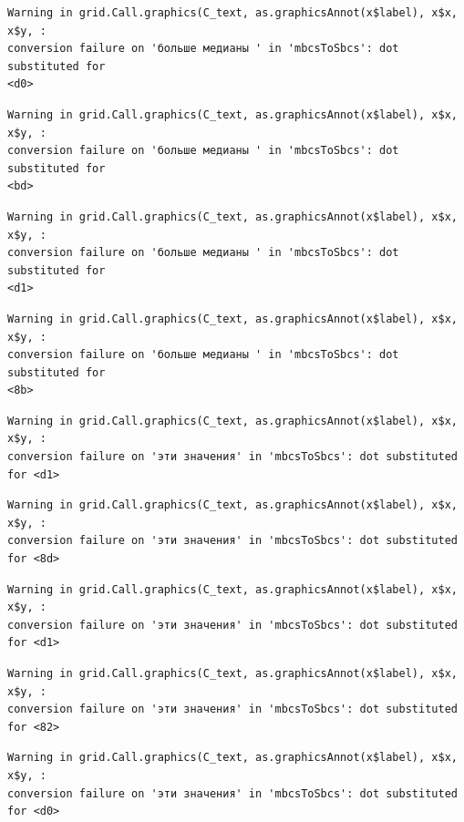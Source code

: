 \documentclass[
  letterpaper,
  DIV=11,
  numbers=noendperiod]{scrreprt}
\theoremstyle{definition}
\theoremstyle{remark}
\begin{document}
\begin{verbatim}
Warning in grid.Call.graphics(C_text, as.graphicsAnnot(x$label), x$x, x$y, :
conversion failure on 'больше медианы ' in 'mbcsToSbcs': dot substituted for
<d0>
\end{verbatim}

\begin{verbatim}
Warning in grid.Call.graphics(C_text, as.graphicsAnnot(x$label), x$x, x$y, :
conversion failure on 'больше медианы ' in 'mbcsToSbcs': dot substituted for
<bd>
\end{verbatim}

\begin{verbatim}
Warning in grid.Call.graphics(C_text, as.graphicsAnnot(x$label), x$x, x$y, :
conversion failure on 'больше медианы ' in 'mbcsToSbcs': dot substituted for
<d1>
\end{verbatim}

\begin{verbatim}
Warning in grid.Call.graphics(C_text, as.graphicsAnnot(x$label), x$x, x$y, :
conversion failure on 'больше медианы ' in 'mbcsToSbcs': dot substituted for
<8b>
\end{verbatim}

\begin{verbatim}
Warning in grid.Call.graphics(C_text, as.graphicsAnnot(x$label), x$x, x$y, :
conversion failure on 'эти значения' in 'mbcsToSbcs': dot substituted for <d1>
\end{verbatim}

\begin{verbatim}
Warning in grid.Call.graphics(C_text, as.graphicsAnnot(x$label), x$x, x$y, :
conversion failure on 'эти значения' in 'mbcsToSbcs': dot substituted for <8d>
\end{verbatim}

\begin{verbatim}
Warning in grid.Call.graphics(C_text, as.graphicsAnnot(x$label), x$x, x$y, :
conversion failure on 'эти значения' in 'mbcsToSbcs': dot substituted for <d1>
\end{verbatim}

\begin{verbatim}
Warning in grid.Call.graphics(C_text, as.graphicsAnnot(x$label), x$x, x$y, :
conversion failure on 'эти значения' in 'mbcsToSbcs': dot substituted for <82>
\end{verbatim}

\begin{verbatim}
Warning in grid.Call.graphics(C_text, as.graphicsAnnot(x$label), x$x, x$y, :
conversion failure on 'эти значения' in 'mbcsToSbcs': dot substituted for <d0>
\end{verbatim}
\end{document}
